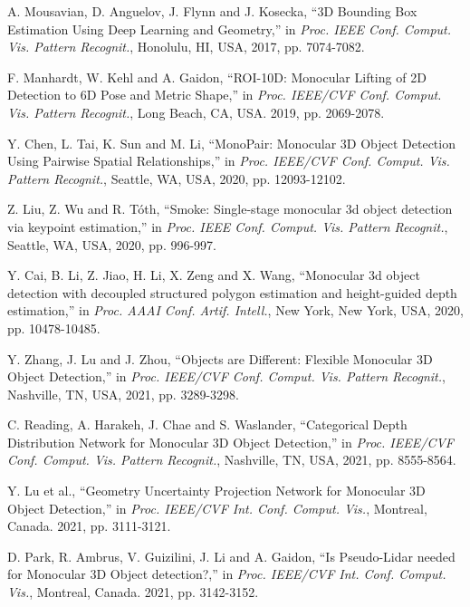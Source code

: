 \documentclass[journal]{IEEEtran}
\begin{document}
	\begin{thebibliography}{1}
			
		A. Mousavian, D. Anguelov, J. Flynn and J. Kosecka, “3D Bounding Box Estimation Using Deep Learning and Geometry,” in \textit{Proc. IEEE Conf. Comput. Vis. Pattern Recognit.}, Honolulu, HI, USA, 2017, pp. 7074-7082.
		
		F. Manhardt, W. Kehl and A. Gaidon, “ROI-10D: Monocular Lifting of 2D Detection to 6D Pose and Metric Shape,” in \textit{Proc. IEEE/CVF Conf. Comput. Vis. Pattern Recognit.}, Long Beach, CA, USA. 2019, pp. 2069-2078.
		
		Y. Chen, L. Tai, K. Sun and M. Li, “MonoPair: Monocular 3D Object Detection Using Pairwise Spatial Relationships,” in \textit{Proc. IEEE/CVF Conf. Comput. Vis. Pattern Recognit.}, Seattle, WA, USA, 2020, pp. 12093-12102.
		
		Z. Liu, Z. Wu and R. Tóth, “Smoke: Single-stage monocular 3d object detection via keypoint estimation,” in \textit{Proc. IEEE Conf. Comput. Vis. Pattern Recognit.}, Seattle, WA, USA, 2020, pp. 996-997.
		
		Y. Cai, B. Li, Z. Jiao, H. Li, X. Zeng and X. Wang, “Monocular 3d object detection with decoupled structured polygon estimation and height-guided depth estimation,” in \textit{Proc. AAAI Conf. Artif. Intell.}, New York, New York, USA, 2020, pp. 10478-10485.
		
		Y. Zhang, J. Lu and J. Zhou, “Objects are Different: Flexible Monocular 3D Object Detection,” in \textit{Proc. IEEE/CVF Conf. Comput. Vis. Pattern Recognit.}, Nashville, TN, USA, 2021, pp. 3289-3298.
		
		C. Reading, A. Harakeh, J. Chae and S. Waslander, “Categorical Depth Distribution Network for Monocular 3D Object Detection,” in \textit{Proc. IEEE/CVF Conf. Comput. Vis. Pattern Recognit.}, Nashville, TN, USA, 2021, pp. 8555-8564.
		
		Y. Lu et al., “Geometry Uncertainty Projection Network for Monocular 3D Object Detection,” in \textit{Proc. IEEE/CVF Int. Conf. Comput. Vis.}, Montreal, Canada. 2021, pp. 3111-3121.
		
		D. Park, R. Ambrus, V. Guizilini, J. Li and A. Gaidon, “Is Pseudo-Lidar needed for Monocular 3D Object detection?,” in \textit{Proc. IEEE/CVF Int. Conf. Comput. Vis.}, Montreal, Canada. 2021, pp. 3142-3152.
		

\end{thebibliography}
\end{document}

